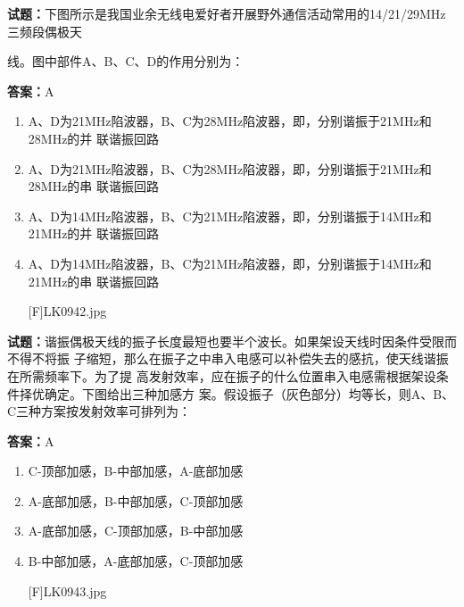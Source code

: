 \documentclass{ctexbook}
\begin{document}




\vspace{1em}

\textbf{试题：}下图所示是我国业余无线电爱好者开展野外通信活动常用的14/21/29MHz三频段偶极天


线。图中部件A、B、C、D的作用分别为： 

\textbf{答案：}A 

\begin{enumerate}[leftmargin=3em]
  \item A、D为21MHz陷波器，B、C为28MHz陷波器，即，分别谐振于21MHz和28MHz的并
联谐振回路 

  \item A、D为21MHz陷波器，B、C为28MHz陷波器，即，分别谐振于21MHz和28MHz的串
联谐振回路 

  \item A、D为14MHz陷波器，B、C为21MHz陷波器，即，分别谐振于14MHz和21MHz的并
联谐振回路 

  \item A、D为14MHz陷波器，B、C为21MHz陷波器，即，分别谐振于14MHz和21MHz的串
联谐振回路 

[F]LK0942.jpg 

\end{enumerate}





\vspace{1em}

\textbf{试题：}谐振偶极天线的振子长度最短也要半个波长。如果架设天线时因条件受限而不得不将振
子缩短，那么在振子之中串入电感可以补偿失去的感抗，使天线谐振在所需频率下。为了提
高发射效率，应在振子的什么位置串入电感需根据架设条件择优确定。下图给出三种加感方
案。假设振子（灰色部分）均等长，则A、B、C三种方案按发射效率可排列为： 

\textbf{答案：}A 

\begin{enumerate}[leftmargin=3em]
  \item C-顶部加感，B-中部加感，A-底部加感 

  \item A-底部加感，B-中部加感，C-顶部加感 

  \item A-底部加感，C-顶部加感，B-中部加感 

  \item B-中部加感，A-底部加感，C-顶部加感 

[F]LK0943.jpg 

\end{enumerate}
\end{document}
